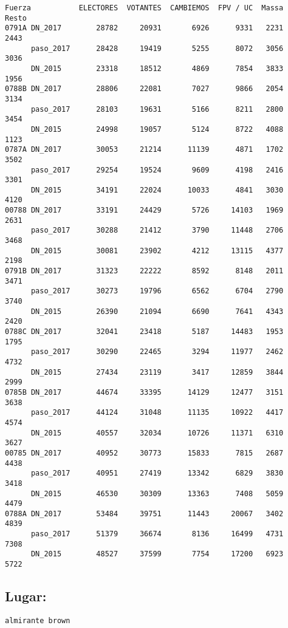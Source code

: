 \documentclass[11pt]{article}
\begin{document}
    \begin{verbatim}
Fuerza           ELECTORES  VOTANTES  CAMBIEMOS  FPV / UC  Massa  Resto
0791A DN_2017        28782     20931       6926      9331   2231   2443
      paso_2017      28428     19419       5255      8072   3056   3036
      DN_2015        23318     18512       4869      7854   3833   1956
0788B DN_2017        28806     22081       7027      9866   2054   3134
      paso_2017      28103     19631       5166      8211   2800   3454
      DN_2015        24998     19057       5124      8722   4088   1123
0787A DN_2017        30053     21214      11139      4871   1702   3502
      paso_2017      29254     19524       9609      4198   2416   3301
      DN_2015        34191     22024      10033      4841   3030   4120
00788 DN_2017        33191     24429       5726     14103   1969   2631
      paso_2017      30288     21412       3790     11448   2706   3468
      DN_2015        30081     23902       4212     13115   4377   2198
0791B DN_2017        31323     22222       8592      8148   2011   3471
      paso_2017      30273     19796       6562      6704   2790   3740
      DN_2015        26390     21094       6690      7641   4343   2420
0788C DN_2017        32041     23418       5187     14483   1953   1795
      paso_2017      30290     22465       3294     11977   2462   4732
      DN_2015        27434     23119       3417     12859   3844   2999
0785B DN_2017        44674     33395      14129     12477   3151   3638
      paso_2017      44124     31048      11135     10922   4417   4574
      DN_2015        40557     32034      10726     11371   6310   3627
00785 DN_2017        40952     30773      15833      7815   2687   4438
      paso_2017      40951     27419      13342      6829   3830   3418
      DN_2015        46530     30309      13363      7408   5059   4479
0788A DN_2017        53484     39751      11443     20067   3402   4839
      paso_2017      51379     36674       8136     16499   4731   7308
      DN_2015        48527     37599       7754     17200   6923   5722
    \end{verbatim}

    
    \hypertarget{lugar}{%
\subsection{Lugar:}\label{lugar}}

    
    \begin{Verbatim}[commandchars=\\\{\}]
almirante brown

    \end{Verbatim}
\end{document}

